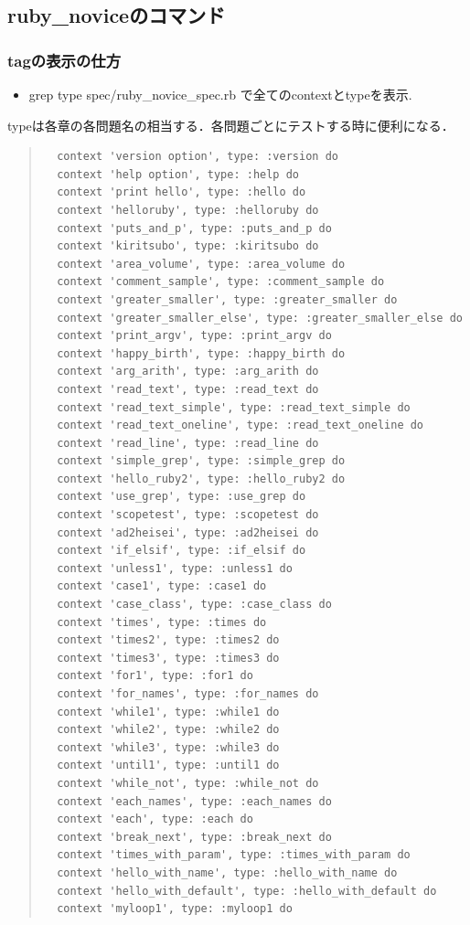 \subsection{ruby\_noviceのコマンド}
\subsubsection{tagの表示の仕方}
\begin{itemize}
\item grep type spec/ruby\_novice\_spec.rb  で全てのcontextとtypeを表示.
\end{itemize}
typeは各章の各問題名の相当する．各問題ごとにテストする時に便利になる．
\begin{quote}\begin{verbatim}
  context 'version option', type: :version do
  context 'help option', type: :help do
  context 'print hello', type: :hello do
  context 'helloruby', type: :helloruby do
  context 'puts_and_p', type: :puts_and_p do
  context 'kiritsubo', type: :kiritsubo do
  context 'area_volume', type: :area_volume do
  context 'comment_sample', type: :comment_sample do
  context 'greater_smaller', type: :greater_smaller do
  context 'greater_smaller_else', type: :greater_smaller_else do
  context 'print_argv', type: :print_argv do
  context 'happy_birth', type: :happy_birth do
  context 'arg_arith', type: :arg_arith do
  context 'read_text', type: :read_text do
  context 'read_text_simple', type: :read_text_simple do
  context 'read_text_oneline', type: :read_text_oneline do
  context 'read_line', type: :read_line do
  context 'simple_grep', type: :simple_grep do
  context 'hello_ruby2', type: :hello_ruby2 do
  context 'use_grep', type: :use_grep do
  context 'scopetest', type: :scopetest do
  context 'ad2heisei', type: :ad2heisei do
  context 'if_elsif', type: :if_elsif do
  context 'unless1', type: :unless1 do
  context 'case1', type: :case1 do
  context 'case_class', type: :case_class do
  context 'times', type: :times do
  context 'times2', type: :times2 do
  context 'times3', type: :times3 do
  context 'for1', type: :for1 do
  context 'for_names', type: :for_names do
  context 'while1', type: :while1 do
  context 'while2', type: :while2 do
  context 'while3', type: :while3 do
  context 'until1', type: :until1 do
  context 'while_not', type: :while_not do
  context 'each_names', type: :each_names do
  context 'each', type: :each do
  context 'break_next', type: :break_next do
  context 'times_with_param', type: :times_with_param do
  context 'hello_with_name', type: :hello_with_name do
  context 'hello_with_default', type: :hello_with_default do
  context 'myloop1', type: :myloop1 do
\end{verbatim}\end{quote}
